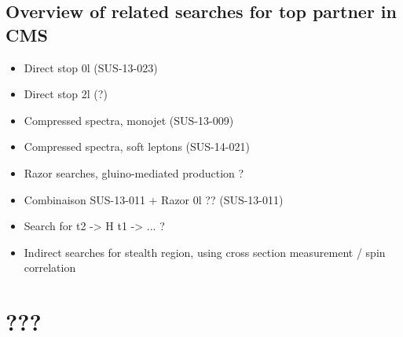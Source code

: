     \section{Overview of related searches for top partner in CMS \label{sec:analysis_overviewStopSearches}}

        \begin{itemize}
            \item Direct stop 0l (SUS-13-023)
            \item Direct stop 2l (?)
            \item Compressed spectra, monojet (SUS-13-009)


            \item Compressed spectra, soft leptons (SUS-14-021)
            \item Razor searches, gluino-mediated production ?
            \item Combinaison SUS-13-011 + Razor 0l ?? (SUS-13-011)
            \item Search for t2 -> H t1 -> ... ?
            \item Indirect searches for stealth region, using cross section measurement / spin correlation
        \end{itemize}


\chapter{???}
        \loremipsum


        \loremipsum





